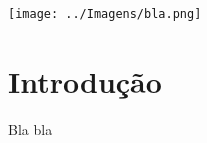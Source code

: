 \documentclass[
	12pt,				%
	oneside,			%
	a4paper,			%
	english,			%
	french,				%
	spanish,			%
	brazil,				%
	]{abntex2}
\begin{document}
\begin{minipage}[c][3.5cm][c]{3cm} %

\centering

\texttt{[image: ../Imagens/bla.png]} 

\end{minipage}


\frenchspacing 


\imprimircapa


\tableofcontents*
\newpage


\section[Introdução]{Introdução}
\pagestyle{fancy}

Bla bla




\end{document}
